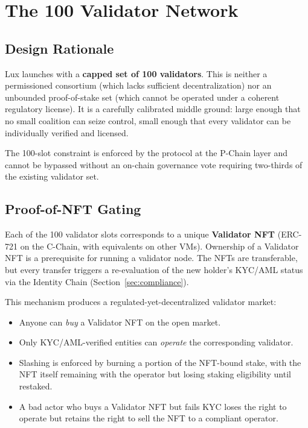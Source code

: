 \section{The 100 Validator Network}


\subsection{Design Rationale}

Lux launches with a \textbf{capped set of 100 validators}. This is
neither a permissioned consortium (which lacks sufficient
decentralization) nor an unbounded proof-of-stake set (which cannot
be operated under a coherent regulatory license). It is a carefully
calibrated middle ground: large enough that no small coalition can
seize control, small enough that every validator can be individually
verified and licensed.

The 100-slot constraint is enforced by the protocol at the P-Chain
layer and cannot be bypassed without an on-chain governance vote
requiring two-thirds of the existing validator set.

\subsection{Proof-of-NFT Gating}

Each of the 100 validator slots corresponds to a unique
\textbf{Validator NFT} (ERC-721 on the C-Chain, with equivalents on
other VMs). Ownership of a Validator NFT is a prerequisite for
running a validator node. The NFTs are transferable, but every
transfer triggers a re-evaluation of the new holder's KYC/AML status
via the Identity Chain (Section~\ref{sec:compliance}).

This mechanism produces a regulated-yet-decentralized validator
market:

\begin{itemize}[nosep]
  \item Anyone can \emph{buy} a Validator NFT on the open market.
  \item Only KYC/AML-verified entities can \emph{operate} the
        corresponding validator.
  \item Slashing is enforced by burning a portion of the NFT-bound
        stake, with the NFT itself remaining with the operator but
        losing staking eligibility until restaked.
  \item A bad actor who buys a Validator NFT but fails KYC loses the
        right to operate but retains the right to sell the NFT to a
        compliant operator.
\end{itemize}

